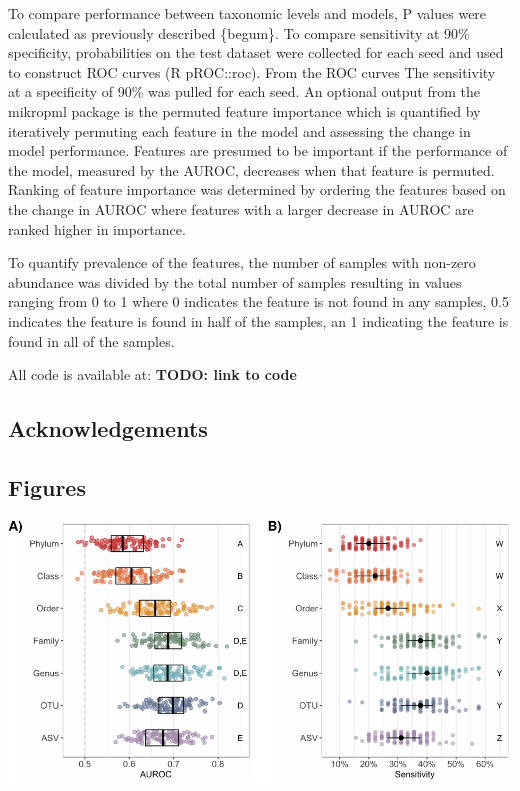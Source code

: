\documentclass[
]{article}
\begin{document}
To compare performance between taxonomic levels and models, P values
were calculated as previously described \{begum\}. To compare
sensitivity at 90\% specificity, probabilities on the test dataset were
collected for each seed and used to construct ROC curves (R pROC::roc).
From the ROC curves The sensitivity at a specificity of 90\% was pulled
for each seed. An optional output from the mikropml package is the
permuted feature importance which is quantified by iteratively permuting
each feature in the model and assessing the change in model performance.
Features are presumed to be important if the performance of the model,
measured by the AUROC, decreases when that feature is permuted. Ranking
of feature importance was determined by ordering the features based on
the change in AUROC where features with a larger decrease in AUROC are
ranked higher in importance.

To quantify prevalence of the features, the number of samples with
non-zero abundance was divided by the total number of samples resulting
in values ranging from 0 to 1 where 0 indicates the feature is not found
in any samples, 0.5 indicates the feature is found in half of the
samples, an 1 indicating the feature is found in all of the samples.

All code is available at: \textbf{TODO: link to code}

\hypertarget{acknowledgements}{%
\subsection{Acknowledgements}\label{acknowledgements}}

\newpage

\hypertarget{figures}{%
\subsection{Figures}\label{figures}}

\includegraphics{manuscript_files/figure-latex/fig1-1.pdf}
\end{document}
